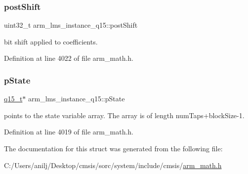 \subsubsection{\texorpdfstring{post\+Shift}{postShift}}
{\footnotesize\ttfamily uint32\+\_\+t arm\+\_\+lms\+\_\+instance\+\_\+q15\+::post\+Shift}

bit shift applied to coefficients. 

Definition at line 4022 of file arm\+\_\+math.\+h.

\mbox{\label{structarm__lms__instance__q15_a9a575ff82c1e68cbb583083439260d08}} 
\subsubsection{\texorpdfstring{p\+State}{pState}}
{\footnotesize\ttfamily \hyperlink{arm__math_8h_ab5a8fb21a5b3b983d5f54f31614052ea}{q15\+\_\+t}$\ast$ arm\+\_\+lms\+\_\+instance\+\_\+q15\+::p\+State}

points to the state variable array. The array is of length num\+Taps+block\+Size-\/1. 

Definition at line 4019 of file arm\+\_\+math.\+h.



The documentation for this struct was generated from the following file\+:\begin{DoxyCompactItemize}
\item 
C\+:/\+Users/anilj/\+Desktop/cmsis/sorc/system/include/cmsis/\hyperlink{arm__math_8h}{arm\+\_\+math.\+h}\end{DoxyCompactItemize}
